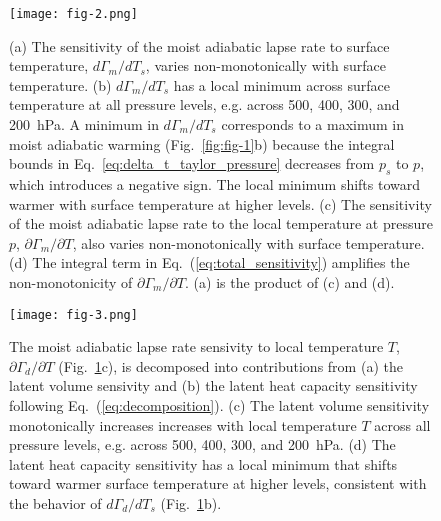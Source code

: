 \documentclass[draft]{ametsocV6.1}
\begin{document}
\begin{figure}[htbp]
 \centering
 \texttt{[image: fig-2.png]}\\
 \caption{(a) The sensitivity of the moist adiabatic lapse rate to surface temperature, $d\Gamma_m/d T_s$, varies non-monotonically with surface temperature. (b) $d\Gamma_m/d T_s$ has a local minimum across surface temperature at all pressure levels, e.g. across 500, 400, 300, and 200~hPa. A minimum in $d\Gamma_m/d T_s$ corresponds to a maximum in moist adiabatic warming (Fig.~\ref{fig:fig-1}b) because the integral bounds in Eq.~\ref{eq:delta_t_taylor_pressure} decreases from $p_s$ to $p$, which introduces a negative sign. The local minimum shifts toward warmer with surface temperature at higher levels. (c) The sensitivity of the moist adiabatic lapse rate to the local temperature at pressure $p$, $\partial\Gamma_m/\partial T$, also varies non-monotonically with surface temperature. (d) The integral term in Eq.~(\ref{eq:total_sensitivity}) amplifies the non-monotonicity of $\partial\Gamma_m/\partial T$. (a) is the product of (c) and (d).}\label{fig:fig-2}
\end{figure}

\begin{figure}[htbp]
 \centering
 \texttt{[image: fig-3.png]}\\
 \caption{The moist adiabatic lapse rate sensivity to local temperature $T$, $\partial \Gamma_d/\partial T$ (Fig.~\ref{fig:fig-2}c), is decomposed into contributions from (a) the latent volume sensivity and (b) the latent heat capacity sensitivity following Eq.~(\ref{eq:decomposition}). (c) The latent volume sensitivity monotonically increases increases with local temperature $T$ across all pressure levels, e.g. across 500, 400, 300, and 200~hPa. (d) The latent heat capacity sensitivity has a local minimum that shifts toward warmer surface temperature at higher levels, consistent with the behavior of $d \Gamma_d/dT_s$ (Fig.~\ref{fig:fig-2}b).}\label{fig:fig-3}
\end{figure}
\end{document}
